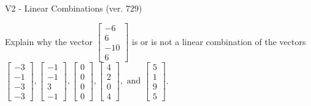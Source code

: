 \begin{exercise}
  \begin{exerciseTitle}V2 - Linear Combinations (ver. 729)\end{exerciseTitle}
  \begin{exerciseStatement}
    Explain why the vector \(\left[\begin{array}{c}
-6 \\
6 \\
-10 \\
6
\end{array}\right]\)  is or is not a linear 
	combination of the vectors \(\left[\begin{array}{c}
-3 \\
-1 \\
-3 \\
-3
\end{array}\right] , \left[\begin{array}{c}
-1 \\
-1 \\
3 \\
-1
\end{array}\right] , \left[\begin{array}{c}
0 \\
0 \\
0 \\
0
\end{array}\right] , \left[\begin{array}{c}
4 \\
2 \\
0 \\
4
\end{array}\right] , \text{ and } \left[\begin{array}{c}
5 \\
1 \\
9 \\
5
\end{array}\right]\).
	



\end{exerciseStatement}
\end{exercise}
